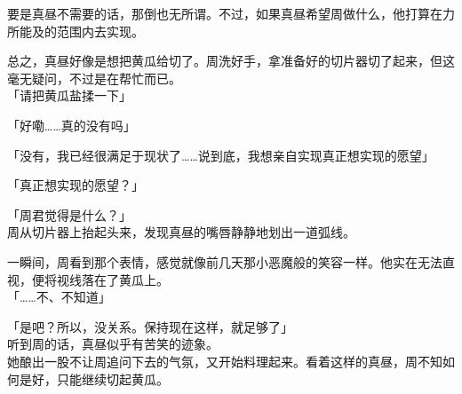 要是真昼不需要的话，那倒也无所谓。不过，如果真昼希望周做什么，他打算在力所能及的范围内去实现。

总之，真昼好像是想把黄瓜给切了。周洗好手，拿准备好的切片器切了起来，但这毫无疑问，不过是在帮忙而已。\\

「请把黄瓜盐揉一下」

「好嘞……真的没有吗」

「没有，我已经很满足于现状了……说到底，我想亲自实现真正想实现的愿望」

「真正想实现的愿望？」

「周君觉得是什么？」\\

周从切片器上抬起头来，发现真昼的嘴唇静静地划出一道弧线。

一瞬间，周看到那个表情，感觉就像前几天那小恶魔般的笑容一样。他实在无法直视，便将视线落在了黄瓜上。\\

「……不、不知道」

「是吧？所以，没关系。保持现在这样，就足够了」\\

听到周的话，真昼似乎有苦笑的迹象。\\

她酿出一股不让周追问下去的气氛，又开始料理起来。看着这样的真昼，周不知如何是好，只能继续切起黄瓜。
